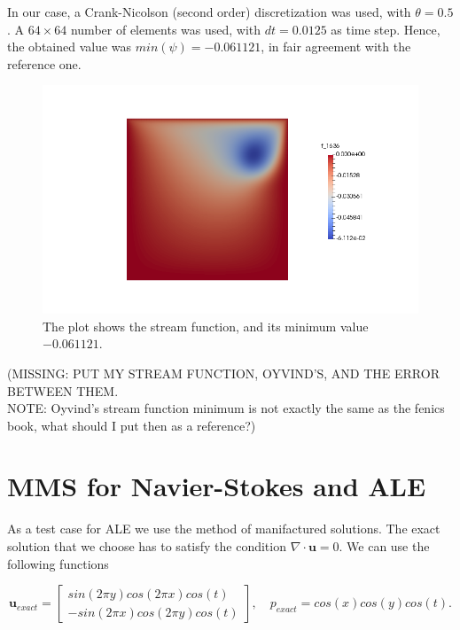 \documentclass[11pt,a4paper,titlepage]{report}
\begin{document}
In our case, a Crank-Nicolson (second order) discretization was used, with $\theta = 0.5$. A $64 \times 64$ number of elements was used, with $dt = 0.0125$ as time step. Hence, the obtained value was $min(\psi) = -0.061 121$, in fair agreement with the reference one. \\

\vspace{-.3cm}
\begin{figure}[ht]
\centering
\includegraphics[width=\textwidth]{images/mine.png}
\vspace{-1cm}
\caption{The plot shows the stream function, and its minimum value $-0.061 121$.}
\end{figure}

(MISSING: PUT MY STREAM FUNCTION, OYVIND'S, AND THE ERROR BETWEEN THEM. \\
NOTE: Oyvind's stream function minimum is not exactly the same as the fenics book, what should I put then as a reference?)

\newpage

\section{MMS for Navier-Stokes and ALE}
As a test case for ALE we use the method of manifactured solutions. The exact solution that we choose has to satisfy the condition $\nabla \cdot \mathbf{u} = 0$. We can use the following functions

\begin{equation}
\mathbf{u}_{exact} = \left[ \begin{array}{c} sin(2\pi y) cos(2\pi x) cos(t) \\ - sin(2 \pi x) cos(2 \pi y) cos(t) \end{array} \right], \quad
p_{exact} = cos(x) cos(y) cos(t).
\end{equation}
\end{document}
